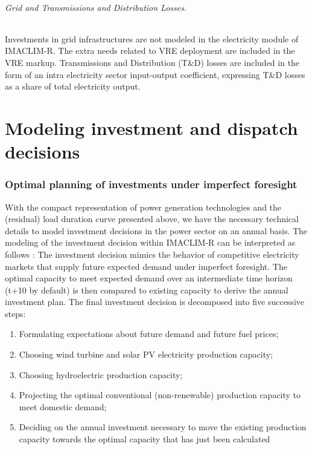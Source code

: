 \paragraph*{Grid and Transmissions and Distribution Losses.}

Investments in grid infrastructures are not modeled in the electricity module of IMACLIM-R. The extra needs related to VRE deployment are included in the VRE markup. Transmissions and Distribution (T\&D) losses are included in the form of an intra electricity sector input-output coefficient, expressing T\&D losses as a share of total electricity output.
\part*{Modeling investment and dispatch decisions}

\section{Optimal planning of investments under imperfect foresight}

With the compact representation of power generation technologies and the (residual) load duration curve presented above, we have the necessary technical details to model investment decisions in the power sector on an annual basis.
The modeling of the investment decision within IMACLIM-R can be interpreted as follows : The investment decision mimics the behavior of competitive electricity markets that supply future expected demand under imperfect foresight. The optimal capacity to meet expected demand over an intermediate time horizon (t+10 by default) is then compared to existing capacity to derive the annual investment plan.
The final investment decision is decomposed into five successive steps:
\begin{enumerate}
    \item Formulating expectations about future demand and future fuel prices;
    \item Choosing  wind turbine and solar PV  electricity production capacity;
    \item Choosing hydroelectric production capacity;
    \item Projecting the optimal conventional (non-renewable) production capacity to meet domestic demand;
    \item Deciding on the annual investment necessary to move the existing production capacity towards the optimal capacity that has just been calculated
\end{enumerate}

